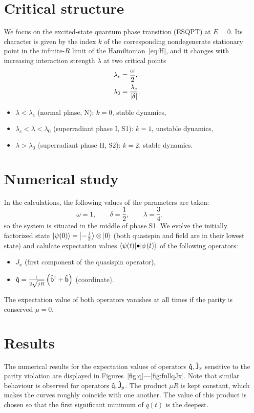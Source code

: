 \documentclass[a4paper,11pt,twoside]{article}
\begin{document}
\section{Critical structure}
	We focus on the excited-state quantum phase transition (ESQPT) at $E=0$.
	Its character is given by the index $k$ of the corresponding nondegenerate stationary point in the infinite-$R$ limit of the Hamiltonian~\eqref{eq:H}, and it changes with increasing interaction strength $\lambda$ at two critical points
	\begin{align}
		\lambda_{c}&=\frac{\omega}{2},\\
		\lambda_{0}&=\frac{\lambda_{c}}{\left|{\delta}\right|}.
	\end{align}
	\begin{itemize}
		\item $\lambda<\lambda_{c}$ (normal phase, N): $k=0$, stable dynamics,
		\item $\lambda_{c}<\lambda<\lambda_{0}$ (superradiant phase I, S1): $k=1$, unstable dynamics,
		\item $\lambda>\lambda_{0}$ (superradiant phase II, S2): $k=2$, stable dynamics.
	\end{itemize}

\section{Numerical study}
	In the calculations, the following values of the parameters are taken:
	\begin{equation}
		\omega=1,\qquad
		\delta=\frac{1}{2},\qquad
		\lambda=\frac{3}{4},\qquad
	\end{equation}
	so the system is situated in the middle of phase S1.
	We evolve the initially factorized state $\left|{\psi(0)}\right\rangle=\left|{-\frac{1}{2}}\right\rangle\otimes\left|{0}\right\rangle$ (both quasispin and field are in their lowest state) and calulate expectation values $\left\langle{\psi(t)}\middle|{\bullet}\middle|{\psi(t)}\right\rangle$ of the following operators:
	\begin{itemize}
		\item $J_{x}$ (first component of the quasispin operator),
		\item $\mathsf{\hat{q}}=\frac{1}{2\sqrt{jR}}\left({\mathsf{\hat{b}}}^{\dagger}+\mathsf{\hat{b}}\right)$ (coordinate).
	\end{itemize}
	The expectation value of both operators vanishes at all times if the parity is conserved $\mu=0$.

\section{Results}
The numerical results for the expectation values of operators $\mathsf{\hat{q}}, \mathsf{\hat{J}}_{x}$ sensitive to the parity violation are displayed in Figures~\ref{fig:q}---\ref{fig:fullqJx}.
Note that similar behaviour is observed for operators $\mathsf{\hat{q}}, \mathsf{\hat{J}}_{y}$.
The product $\mu R$ is kept constant, which makes the curves roughly coincide with one another.
The value of this product is chosen so that the first significant minimum of $q(t)$ is the deepest.
\end{document}
